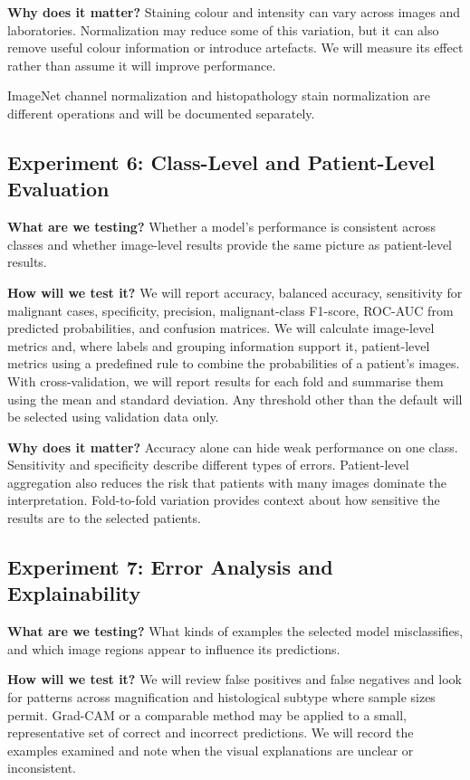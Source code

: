 \documentclass[11pt,a4paper]{article}
\begin{document}
\textbf{Why does it matter?} Staining colour and intensity can vary across images and laboratories. Normalization may reduce some of this variation, but it can also remove useful colour information or introduce artefacts. We will measure its effect rather than assume it will improve performance.

ImageNet channel normalization and histopathology stain normalization are different operations and will be documented separately.

\subsection{Experiment 6: Class-Level and Patient-Level Evaluation}

\textbf{What are we testing?} Whether a model's performance is consistent across classes and whether image-level results provide the same picture as patient-level results.

\textbf{How will we test it?} We will report accuracy, balanced accuracy, sensitivity for malignant cases, specificity, precision, malignant-class F1-score, ROC-AUC from predicted probabilities, and confusion matrices. We will calculate image-level metrics and, where labels and grouping information support it, patient-level metrics using a predefined rule to combine the probabilities of a patient's images. With cross-validation, we will report results for each fold and summarise them using the mean and standard deviation. Any threshold other than the default will be selected using validation data only.

\textbf{Why does it matter?} Accuracy alone can hide weak performance on one class. Sensitivity and specificity describe different types of errors. Patient-level aggregation also reduces the risk that patients with many images dominate the interpretation. Fold-to-fold variation provides context about how sensitive the results are to the selected patients.

\subsection{Experiment 7: Error Analysis and Explainability}

\textbf{What are we testing?} What kinds of examples the selected model misclassifies, and which image regions appear to influence its predictions.

\textbf{How will we test it?} We will review false positives and false negatives and look for patterns across magnification and histological subtype where sample sizes permit. Grad-CAM or a comparable method may be applied to a small, representative set of correct and incorrect predictions. We will record the examples examined and note when the visual explanations are unclear or inconsistent.
\end{document}
